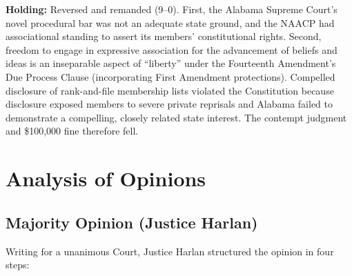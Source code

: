 \documentclass[12pt]{article}
\begin{document}
\textbf{Holding:} Reversed and remanded (9--0). First, the Alabama Supreme Court's novel procedural bar was not an adequate state ground, and the NAACP had associational standing to assert its members' constitutional rights. Second, freedom to engage in expressive association for the advancement of beliefs and ideas is an inseparable aspect of ``liberty'' under the Fourteenth Amendment's Due Process Clause (incorporating First Amendment protections). Compelled disclosure of rank-and-file membership lists violated the Constitution because disclosure exposed members to severe private reprisals and Alabama failed to demonstrate a compelling, closely related state interest. The contempt judgment and \$100,000 fine therefore fell.

\section{Analysis of Opinions}
\subsection{Majority Opinion (Justice Harlan)}

Writing for a unanimous Court, Justice Harlan structured the opinion in four steps:
\end{document}
